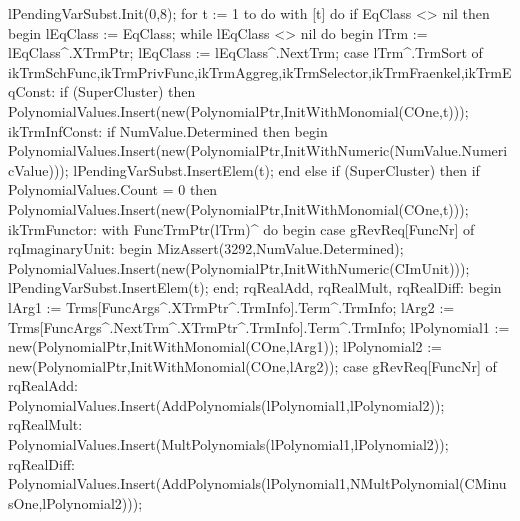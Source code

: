    lPendingVarSubst.Init(0,8);
   for t := 1 to  do
      with [t] do
         if EqClass <> nil then
         begin
            lEqClass := EqClass;
            while lEqClass <> nil do
            begin
               lTrm := lEqClass^.XTrmPtr;
               lEqClass := lEqClass^.NextTrm;
               case lTrm^.TrmSort of
                  ikTrmSchFunc,ikTrmPrivFunc,ikTrmAggreg,ikTrmSelector,ikTrmFraenkel,ikTrmEqConst:
                     if (SuperCluster) then
                        PolynomialValues.Insert(new(PolynomialPtr,InitWithMonomial(COne,t)));
                  ikTrmInfConst:
                     if NumValue.Determined then
                     begin
                        PolynomialValues.Insert(new(PolynomialPtr,InitWithNumeric(NumValue.NumericValue)));
                        lPendingVarSubst.InsertElem(t);
                     end
                     else if (SuperCluster) then
                        if PolynomialValues.Count = 0 then
                           PolynomialValues.Insert(new(PolynomialPtr,InitWithMonomial(COne,t)));
                  ikTrmFunctor:
                     with FuncTrmPtr(lTrm)^ do
                  begin
                     case gRevReq[FuncNr] of
                        rqImaginaryUnit:
                           begin
                              MizAssert(3292,NumValue.Determined);
                              PolynomialValues.Insert(new(PolynomialPtr,InitWithNumeric(CImUnit)));
                              lPendingVarSubst.InsertElem(t);
                           end;
                        rqRealAdd, rqRealMult, rqRealDiff:
                           begin
                              lArg1 := Trms[FuncArgs^.XTrmPtr^.TrmInfo].Term^.TrmInfo;
                              lArg2 := Trms[FuncArgs^.NextTrm^.XTrmPtr^.TrmInfo].Term^.TrmInfo;
                              lPolynomial1 := new(PolynomialPtr,InitWithMonomial(COne,lArg1));
                              lPolynomial2 := new(PolynomialPtr,InitWithMonomial(COne,lArg2));
                              case gRevReq[FuncNr] of
                                 rqRealAdd:
                                    PolynomialValues.Insert(AddPolynomials(lPolynomial1,lPolynomial2));
                                 rqRealMult:
                                    PolynomialValues.Insert(MultPolynomials(lPolynomial1,lPolynomial2));
                                 rqRealDiff:
                                    PolynomialValues.Insert(AddPolynomials(lPolynomial1,NMultPolynomial(CMinusOne,lPolynomial2)));

